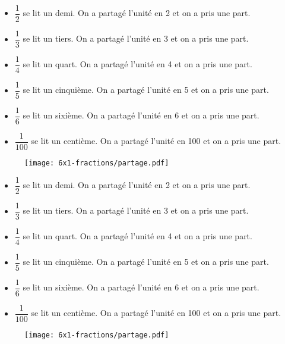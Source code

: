 



\begin{itemize}[label={$\bullet$}]
  \item $\dfrac{1}{2}$ se lit un demi. On a partagé l'unité en 2 et on a pris une part.
  \item $\dfrac{1}{3}$ se lit un tiers. On a partagé l'unité en 3 et on a pris une part.
  \item $\dfrac{1}{4}$ se lit un quart. On a partagé l'unité en 4 et on a pris une part.
  \item $\dfrac{1}{5}$ se lit un cinquième. On a partagé l'unité en 5 et on a pris une part.
  \item $\dfrac{1}{6}$ se lit un sixième. On a partagé l'unité en 6 et on a pris une part.
  \item $\dfrac{1}{100}$ se lit un centième. On a partagé l'unité en 100 et on a pris une part.
\end{itemize}

\begin{figure}[H]
  \texttt{[image: 6x1-fractions/partage.pdf]}
\end{figure}


\begin{itemize}[label={$\bullet$}]
  \item $\dfrac{1}{2}$ se lit un demi. On a partagé l'unité en 2 et on a pris une part.
  \item $\dfrac{1}{3}$ se lit un tiers. On a partagé l'unité en 3 et on a pris une part.
  \item $\dfrac{1}{4}$ se lit un quart. On a partagé l'unité en 4 et on a pris une part.
  \item $\dfrac{1}{5}$ se lit un cinquième. On a partagé l'unité en 5 et on a pris une part.
  \item $\dfrac{1}{6}$ se lit un sixième. On a partagé l'unité en 6 et on a pris une part.
  \item $\dfrac{1}{100}$ se lit un centième. On a partagé l'unité en 100 et on a pris une part.
\end{itemize}

\begin{figure}[H]
  \texttt{[image: 6x1-fractions/partage.pdf]}
\end{figure}


